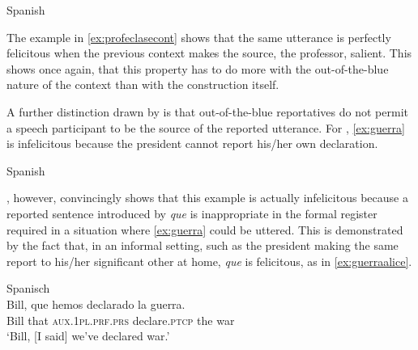 \ea Spanish\judgewidth{\#}
\z
\z

The example in \eqref{ex:profeclasecont} shows that the same utterance is perfectly felicitous when the previous context makes the source, the professor, salient. This shows once again, that this property has to do more with the out-of-the-blue nature of the context than with the construction itself.


A further distinction drawn by \citet{DemonteSoriano2014}  is that out-of-the-blue reportatives do not permit a speech participant to be the source of the reported utterance. For \citet{DemonteSoriano2014}, \eqref{ex:guerra} is infelicitous because the president cannot report his/her own declaration.

\ea Spanish\label{ex:guerra} \citep[154, ex 15]{DemonteSoriano2014}\\
\z

\citet{Corr2016}, however, convincingly shows that this example is actually infelicitous because a reported sentence introduced by \emph{que}  is inappropriate in the formal register required in a situation where \eqref{ex:guerra} could be uttered. This is demonstrated by the fact that, in an informal setting, such as the president making the same report to his/her significant other at home, \emph{que} is felicitous, as  in \eqref{ex:guerraalice}. 


\ea\label{ex:guerraalice} Spanisch \citep[154: ex 16]{Corr2016}\\
\gll Bill, que hemos declarado la guerra. \\
	Bill	that \textsc{aux.1pl.prf.prs} declare.\textsc{ptcp} the war\\
	\glt `Bill, [I said] we’ve declared war.' 
\z

